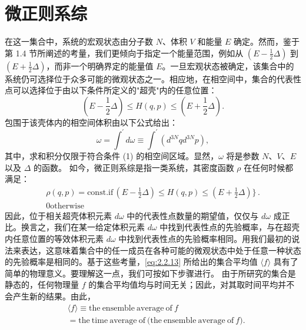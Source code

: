\section{微正则系综}\label{ux5faeux6b63ux5219ux7cfbux7efc}
在这一集合中，系统的宏观状态由分子数 \(N\)、体积 \(V\) 和能量 \(E\) 确定。然而，鉴于第 1.4 节所阐述的考量，我们更倾向于指定一个能量范围，例如从 \((E-\frac{1}{2}\Delta)\) 到 \((E+\frac{1}{2}\Delta)\)，而非一个明确界定的能量值 \(E\)。一旦宏观状态被确定，该集合中的系统仍可选择位于众多可能的微观状态之一。相应地，在相空间中，集合的代表性点可以选择位于由以下条件所定义的"超壳"内的任意位置：
\begin{equation}\tag{2.3.1}\label{eq:2.3.1}
\left( E - \frac { 1 } { 2 } \Delta \right) \leq H ( q , p ) \leq \left( E + \frac { 1 } { 2 } \Delta \right) .
\end{equation}
包围于该壳体内的相空间体积由以下公式给出：
\begin{equation}\tag{2.3.2}\label{eq:2.3.2}
\omega = \int ^{\prime} d \omega \equiv \int ^{\prime} \left( d ^{3 N} q d ^{3 N} p \right) ,
\end{equation}
其中，求和积分仅限于符合条件 (1) 的相空间区域。显然，\(\omega\) 将是参数 \(N\)、\(V\)、\(E\) 以及 \(\Delta\) 的函数。
如今，微正则系综是指一类系统，其密度函数 \(\rho\) 在任何时候都满足：
\begin{equation}\tag{2.3.3}\label{eq:2.3.3}
\begin{array}{r} { \rho ( q , p ) = \mathrm { c o n s t . }  \mathrm { i f } \, \left( E - \frac { 1 } { 2 } \Delta \right) \leq H ( q , p ) \leq \left( E + \frac { 1 } { 2 } \Delta \right) \Bigg \} \, . } \\{ 0  \mathrm { o t h e r w i s e }  } \end{array}
\end{equation}
因此，位于相关超壳体积元素 \(d\omega\) 中的代表性点数量的期望值，仅仅与 \(d\omega\) 成正比。换言之，我们在某一给定体积元素 \(d\omega\) 中找到代表性点的先验概率，与在超壳内任意位置的等效体积元素 \(d\omega\) 中找到代表性点的先验概率相同。用我们最初的说法来表达，这意味着集合中的任一成员在各种可能的微观状态中处于任意一种状态的先验概率是相同的。基于这些考量，\autoref{eq:2.2.13} 所给出的集合平均值 \(\langle f \rangle\) 具有了简单的物理意义。要理解这一点，我们可按如下步骤进行。
由于所研究的集合是静态的，任何物理量 \(f\) 的集合平均值均与时间无关；因此，对其取时间平均并不会产生新的结果。由此，
\begin{equation}\tag{2.3.4}\label{eq:2.3.4}
\begin{array}{rl} & { \langle f \rangle \equiv \mathrm { t h e ~ e n s e m b l e ~ a v e r a g e ~ o f ~ } f } \\& { = \mathrm { t h e ~ t i m e ~ a v e r a g e ~ o f ~ ( t h e ~ e n s e m b l e ~ a v e r a g e ~ o f ~ } f ) . } \end{array}
\end{equation}
